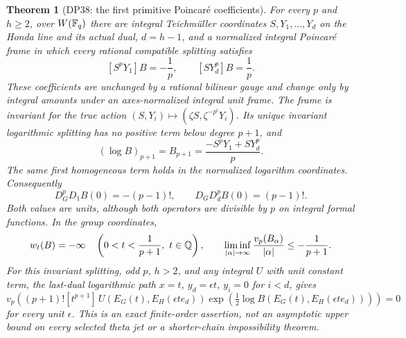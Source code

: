 \documentclass[11pt,a4paper]{article}
\newtheorem{theorem}{Theorem}[section]
\theoremstyle{definition}\newtheorem{remark}[theorem]{Remark}
\begin{document}
\begin{theorem}[DP38: the first primitive Poincar\'e coefficients]\label{DP38}
For every $p$ and $h\ge2$, over $W(\mathbb F_q)$ there are integral Teichm\"uller coordinates $S,Y_1,\ldots,Y_d$ on the Honda line and its actual dual, $d=h-1$, and a normalized integral Poincar\'e frame in which every rational compatible splitting satisfies
\[
 [S^pY_1]B=-\frac1p,\qquad [SY_d^p]B=\frac1p.
\]
These coefficients are unchanged by a rational bilinear gauge and change only by integral amounts under an axes-normalized integral unit frame. The frame is invariant for the true action $(S,Y_i)\mapsto(\zeta S,\zeta^{-p^i}Y_i)$. Its unique invariant logarithmic splitting has no positive term below degree $p+1$, and
\begin{equation}\label{eq:primitive-first}
 (\log B)_{p+1}=B_{p+1}=\frac{-S^pY_1+SY_d^p}{p}.
\end{equation}
The same first homogeneous term holds in the normalized logarithm coordinates. Consequently
\[
 D_G^pD_1 B(0)=-(p-1)!,\qquad D_GD_d^p B(0)=(p-1)!.
\]
Both values are units, although both operators are divisible by $p$ on integral formal functions. In the group coordinates,
\[
 w_t(B)=-\infty\quad\left(0<t<\frac1{p+1},\ t\in\Q\right),\qquad
 \liminf_{|\alpha|\to\infty}\frac{v_p(B_\alpha)}{|\alpha|}\le-\frac1{p+1}.
\]
For this invariant splitting, odd $p$, $h>2$, and any integral $U$ with unit constant term, the last-dual logarithmic path $x=t$, $y_d=\epsilon t$, $y_i=0$ for $i<d$, gives
\begin{equation}\label{eq:primitive-path-unit}
 v_p\left((p+1)![t^{p+1}]\,
 U(E_G(t),E_H(\epsilon te_d))
 \exp\left(\tfrac12\log B(E_G(t),E_H(\epsilon te_d))\right)\right)=0
\end{equation}
for every unit $\epsilon$. This is an exact finite-order assertion, not an asymptotic upper bound on every selected theta jet or a shorter-chain impossibility theorem.
\end{theorem}
\end{document}
